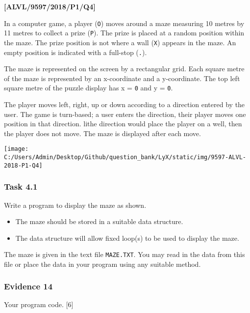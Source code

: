 \item \textbf{{[}ALVL/9597/2018/P1/Q4{]} }

In a computer game, a player (\textquotedbl\texttt{O}\textquotedbl )
moves around a maze measuring 10 metres by 11 metres to collect a
prize (\textquotedbl\texttt{P}\textquotedbl ). The prize is placed
at a random position within the maze. The prize position is not where
a wall (\textquotedbl\texttt{X}\textquotedbl ) appears in the maze.
An empty position is indicated with a full-stop (\textquotedbl\texttt{.}\textquotedbl ). 

The maze is represented on the screen by a rectangular grid. Each
square metre of the maze is represented by an x-coordinate and a y-coordinate.
The top left square metre of the puzzle display has x = \texttt{0}
and y = \texttt{0}.

The player moves left, right, up or down according to a direction
entered by the user. The game is turn-based; a user enters the direction,
their player moves one position in that direction. lithe direction
would place the player on a well, then the player does not move. The
maze is displayed after each move.
\begin{center}
\texttt{[image: C:/Users/Admin/Desktop/Github/question\_bank/LyX/static/img/9597-ALVL-2018-P1-Q4]}
\par\end{center}

\subsubsection*{Task 4.1}

Write a program to display the maze as shown.
\begin{itemize}
\item The maze should be stored in a suitable data structure.
\item The data structure will allow fixed loop(s) to be used to display
the maze.
\end{itemize}
The maze is given in the text file \texttt{MAZE.TXT}. You may read
in the data from this file or place the data in your program using
any suitable method.

\subsubsection*{Evidence 14}

Your program code. \hfill{} {[}6{]}

